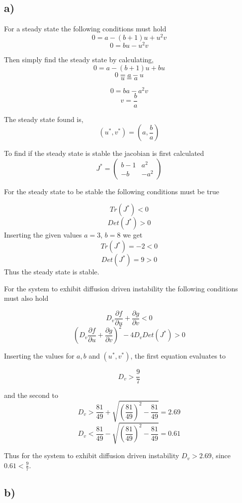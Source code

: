 \subsection*{a)}
For a steady state the following conditions must hold
$$0 = a - (b+1)u + u^2v$$
$$0 = bu - u^2v$$

Then simply find the steady state by calculating,
$$0 = a-(b+1)u +bu$$
$$0 = a - u$$
$$u = a$$

$$0 = ba - a^2v$$
$$v = \frac{b}{a}$$

The steady state found is,
$$(u^*, v^*)=\left(a,\frac{b}{a}\right)$$

To find if the steady state is stable the jacobian is first calculated
$$J^* = \left(
\begin{array}{cc}
    b-1 & a^2 \\
    -b  & -a^2
\end{array}
\right)$$

For the steady state to be stable the following conditions must be true

$$Tr(J^*) < 0$$
$$Det(J^*) > 0$$
Inserting the given values $a=3$, $b=8$ we get
$$Tr(J^*) = -2 < 0$$
$$Det(J^*) = 9 > 0$$
Thus the steady state is stable.

For the system to exhibit diffusion driven instability the following conditions must also hold

$$D_v \frac{\partial f}{\partial u} + \frac{\partial g}{\partial v} < 0$$
$$(D_v \frac{\partial f}{\partial u}+ \frac{\partial g}{\partial v})^2 - 4D_v Det(J^*) > 0$$

Inserting the values for $a, b$ and $(u^*, v^*)$, the first equation evaluates to

$$D_v > \frac{9}{7}$$

and the second to
$$D_v > \frac{81}{49} + \sqrt{\left(\frac{81}{49}\right)^2 - \frac{81}{49}} = 2.69$$
$$D_v < \frac{81}{49} - \sqrt{\left(\frac{81}{49}\right)^2 - \frac{81}{49}} = 0.61$$

Thus for the system to exhibit diffusion driven instability $D_v > 2.69$, since $0.61 < \frac{9}{7}$.


\subsection*{b)}


